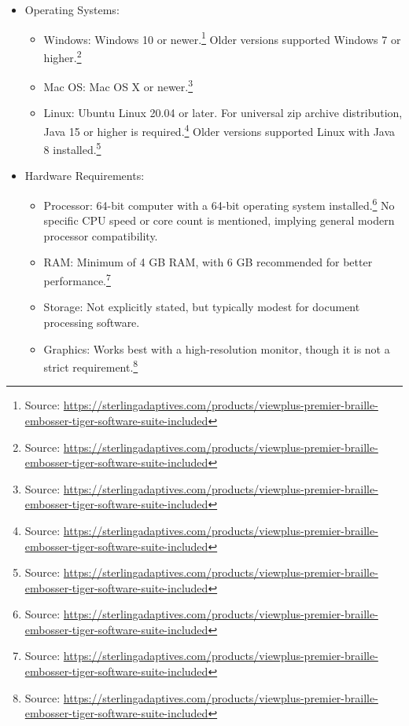 \begin{itemize}
    \item Operating Systems:
    \begin{itemize}
        \item Windows: Windows 10 or newer.\footnote{Source:  \url{https://sterlingadaptives.com/products/viewplus-premier-braille-embosser-tiger-software-suite-included}} Older versions supported Windows 7 or higher.\footnote{Source:  \url{https://sterlingadaptives.com/products/viewplus-premier-braille-embosser-tiger-software-suite-included}}
        \item Mac OS: Mac OS X or newer.\footnote{Source:  \url{https://sterlingadaptives.com/products/viewplus-premier-braille-embosser-tiger-software-suite-included}}
        \item Linux: Ubuntu Linux 20.04 or later. For universal zip archive distribution, Java 15 or higher is required.\footnote{Source:  \url{https://sterlingadaptives.com/products/viewplus-premier-braille-embosser-tiger-software-suite-included}} Older versions supported Linux with Java 8 installed.\footnote{Source:  \url{https://sterlingadaptives.com/products/viewplus-premier-braille-embosser-tiger-software-suite-included}}
    \end{itemize}
    \item Hardware Requirements:
    \begin{itemize}
        \item Processor: 64-bit computer with a 64-bit operating system installed.\footnote{Source:  \url{https://sterlingadaptives.com/products/viewplus-premier-braille-embosser-tiger-software-suite-included}} No specific CPU speed or core count is mentioned, implying general modern processor compatibility.
        \item RAM: Minimum of 4 GB RAM, with 6 GB recommended for better performance.\footnote{Source:  \url{https://sterlingadaptives.com/products/viewplus-premier-braille-embosser-tiger-software-suite-included}}
        \item Storage: Not explicitly stated, but typically modest for document processing software.
        \item Graphics: Works best with a high-resolution monitor, though it is not a strict requirement.\footnote{Source:  \url{https://sterlingadaptives.com/products/viewplus-premier-braille-embosser-tiger-software-suite-included}}
    \end{itemize}
\end{itemize}

